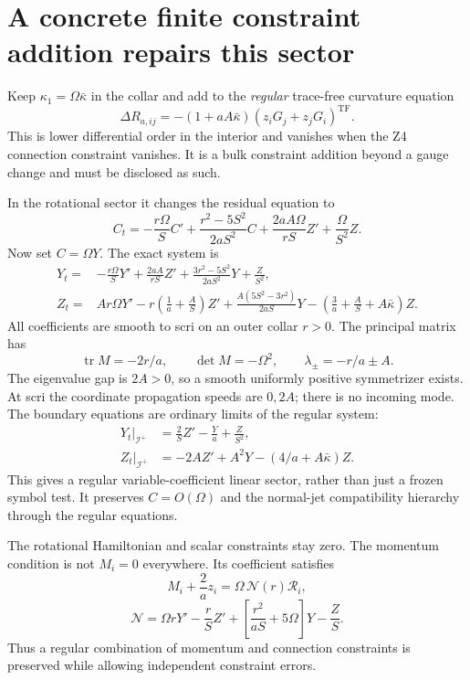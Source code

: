 \documentclass[11pt]{article}
\newcommand{\scri}{\mathscr I^+}
\newcommand{\TF}{\mathrm{TF}}
\newcommand{\Tr}{\operatorname{tr}}
\begin{document}
\section{A concrete finite constraint addition repairs this sector}
Keep $\kappa_1=\Omega\bar\kappa$ in the collar and add to the \emph{regular} trace-free curvature equation
\begin{equation}\boxed{
\Delta R_{a,ij}=-(1+aA\bar\kappa)
(z_iG_j+z_jG_i)^{\TF}.
}\end{equation}
This is lower differential order in the interior and vanishes when the Z4 connection constraint vanishes. It is a bulk constraint addition beyond a gauge change and must be disclosed as such.

In the rotational sector it changes the residual equation to
\[
C_t=-\frac{r\Omega}{S}C'
+\frac{r^2-5S^2}{2aS^2}C
+\frac{2aA\Omega}{rS}Z'
+\frac{\Omega}{S^2}Z.
\]
Now set $C=\Omega Y$. The exact system is
\begin{align}
Y_t={}&-\frac{r\Omega}{S}Y'
+\frac{2aA}{rS}Z'
+\frac{3r^2-5S^2}{2aS^2}Y+\frac{Z}{S^2},\\
Z_t={}&Ar\Omega Y'
-r\left(\frac1a+\frac AS\right)Z'
+\frac{A(5S^2-3r^2)}{2aS}Y
-\left(\frac3a+\frac AS+A\bar\kappa\right)Z .
\end{align}
All coefficients are smooth to scri on an outer collar $r>0$. The principal matrix has
\[
\Tr M=-2r/a,\qquad\det M=-\Omega^2,\qquad
\lambda_\pm=-r/a\pm A.
\]
The eigenvalue gap is $2A>0$, so a smooth uniformly positive symmetrizer exists. At scri the coordinate propagation speeds are $0,2A$; there is no incoming mode. The boundary equations are ordinary limits of the regular system:
\begin{align}
Y_t|_{\scri}&=\frac2S Z'-\frac Ya+\frac Z{S^2},\\
Z_t|_{\scri}&=-2A Z'+A^2Y-(4/a+A\bar\kappa)Z .
\end{align}
This gives a regular variable-coefficient linear sector, rather than just a frozen symbol test. It preserves $C=O(\Omega)$ and the normal-jet compatibility hierarchy through the regular equations.

The rotational Hamiltonian and scalar constraints stay zero. The momentum condition is not $M_i=0$ everywhere. Its coefficient satisfies
\[
M_i+\frac2a z_i=\Omega\,\mathcal N(r)\mathcal R_i,
\]
\[
\mathcal N=\Omega rY'-\frac rS Z'
+\left[\frac{r^2}{aS}+5\Omega\right]Y-\frac ZS .
\]
Thus a regular combination of momentum and connection constraints is preserved while allowing independent constraint errors.
\end{document}
